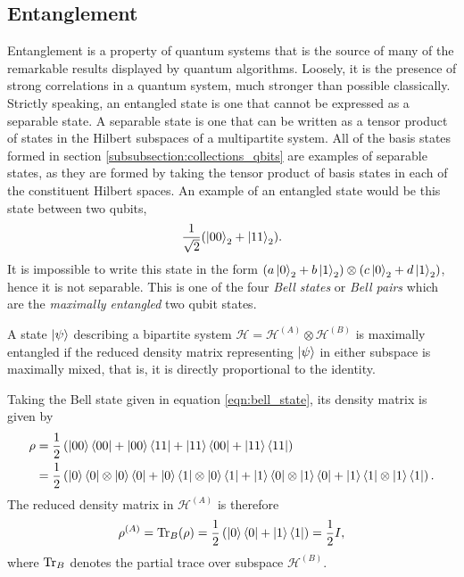 \subsection{Entanglement}
Entanglement is a property of quantum systems that is the source of many of the remarkable results displayed by quantum algorithms.
Loosely, it is the presence of strong correlations in a quantum system, much stronger than possible classically.
Strictly speaking, an entangled state is one that cannot be expressed as a separable state.
A separable state is one that can be written as a tensor product of states in the Hilbert subspaces of a multipartite system.
All of the basis states formed in section \ref{subsubsection:collections_qbits} are examples of separable states, as they are formed by taking the tensor product of basis states in each of the constituent Hilbert spaces.
An example of an entangled state would be this state between two qubits,
\begin{equation}
    \label{eqn:bell_state}
    \frac{1}{\sqrt{2}}(\ket{00}_2 + \ket{11}_2).
\end{equation}
It is impossible to write this state in the form $\left(a\ket{0}_2 + b\ket{1}_2\right) \otimes \left(c\ket{0}_2 + d\ket{1}_2 \right)$, hence it is not separable.
This is one of the four \emph{Bell states} or \emph{Bell pairs} which are the \emph{maximally entangled} two qubit states.
\begin{definition}
    A state $\ket{\psi}$ describing a bipartite system $\mathcal{H} = \mathcal{H}^{(A)} \otimes \mathcal{H}^{(B)}$ is maximally entangled if the reduced density matrix representing $\ket{\psi}$ in either subspace is maximally mixed, that is, it is directly proportional to the identity.
\end{definition}
Taking the Bell state given in equation \ref{eqn:bell_state}, its density matrix is given by
\begin{align}
    \rho &= \frac{1}{2}\left(\ket{00}\bra{00} + \ket{00}\bra{11} + \ket{11}\bra{00} + \ket{11}\bra{11}\right)\\
    &= \frac{1}{2}\left(\ket{0}\bra{0}\otimes\ket{0}\bra{0} + \ket{0}\bra{1}\otimes\ket{0}\bra{1} + \ket{1}\bra{0}\otimes\ket{1}\bra{0} + \ket{1}\bra{1}\otimes\ket{1}\bra{1}\right).
\end{align}
The reduced density matrix in $\mathcal{H}^{(A)}$ is therefore
\begin{equation}
    \rho^{(A)} = \operatorname{Tr}_B(\rho) = \frac{1}{2}\left(\ket{0}\bra{0} + \ket{1}\bra{1}\right) = \frac{1}{2}I,
\end{equation}
where $\operatorname{Tr}_B$ denotes the partial trace over subspace $\mathcal{H}^{(B)}$.

